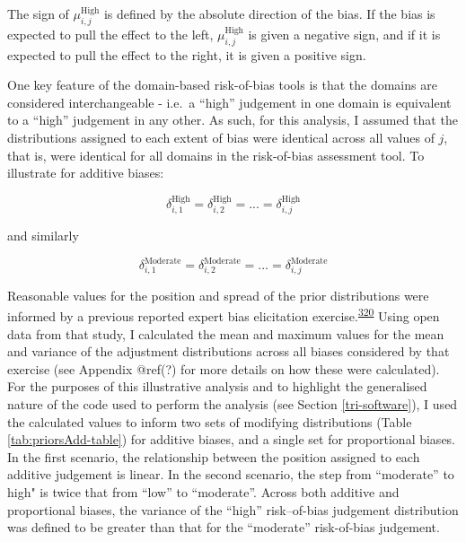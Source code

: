 \documentclass[a4paper, twoside]{templates/ociamthesis}
\begin{document}
The sign of \(\mu_{i,j}^{\mathrm{High}}\) is defined by the absolute direction of the bias. If the bias is expected to pull the effect to the left, \(\mu_{i,j}^{\mathrm{High}}\) is given a negative sign, and if it is expected to pull the effect to the right, it is given a positive sign.

One key feature of the domain-based risk-of-bias tools is that the domains are considered interchangeable - i.e.~a ``high'' judgement in one domain is equivalent to a ``high'' judgement in any other. As such, for this analysis, I assumed that the distributions assigned to each extent of bias were identical across all values of \(j\), that is, were identical for all domains in the risk-of-bias assessment tool. To illustrate for additive biases:

\[
\delta_{i,1}^{\mathrm{High}} = \delta_{i,2}^{\mathrm{High}} = ... = \delta_{i,j}^{\mathrm{High}}
\]

and similarly

\[
\delta_{i,1}^{\mathrm{Moderate}} = \delta_{i,2}^{\mathrm{Moderate}} = ... = \delta_{i,j}^{\mathrm{Moderate}}
\]

Reasonable values for the position and spread of the prior distributions were informed by a previous reported expert bias elicitation exercise.\textsuperscript{\protect\hyperlink{ref-turner2009}{320}} Using open data from that study, I calculated the mean and maximum values for the mean and variance of the adjustment distributions across all biases considered by that exercise (see Appendix @ref(?) for more details on how these were calculated). For the purposes of this illustrative analysis and to highlight the generalised nature of the code used to perform the analysis (see Section \ref{tri-software}), I used the calculated values to inform two sets of modifying distributions (Table \ref{tab:priorsAdd-table}) for additive biases, and a single set for proportional biases. In the first scenario, the relationship between the position assigned to each additive judgement is linear. In the second scenario, the step from ``moderate'' to high" is twice that from ``low'' to ``moderate''. Across both additive and proportional biases, the variance of the ``high'' risk--of-bias judgement distribution was defined to be greater than that for the ``moderate'' risk-of-bias judgement.

~
\end{document}
